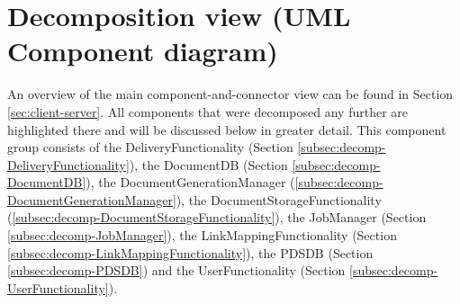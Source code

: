 \documentclass[a4paper,10pt]{article}
\begin{document}
\section{Decomposition view (UML Component diagram)}\label{sec:decomposition}
An overview of the main component-and-connector view can be found in Section \ref{sec:client-server}. All components that were decomposed any further are highlighted there and will be discussed below in greater detail. This component group consists of the DeliveryFunctionality (Section \ref{subsec:decomp-DeliveryFunctionality}), the DocumentDB (Section \ref{subsec:decomp-DocumentDB}), the DocumentGenerationManager (\ref{subsec:decomp-DocumentGenerationManager}), the DocumentStorageFunctionality (\ref{subsec:decomp-DocumentStorageFunctionality}), the JobManager (Section \ref{subsec:decomp-JobManager}), the LinkMappingFunctionality (Section \ref{subsec:decomp-LinkMappingFunctionality}), the PDSDB (Section \ref{subsec:decomp-PDSDB}) and the UserFunctionality (Section \ref{subsec:decomp-UserFunctionality}).
\end{document}
